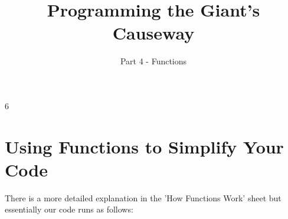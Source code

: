 \documentclass{geocraft-worksheet-multipage}
\begin{document}
\title{Programming the Giant's Causeway}
\subtitle{Part 4 - Functions}

\date{}
\maketitle


\setcounter {section} {6}

\section{Using Functions to Simplify Your Code}\vspace{-0.3cm}
\lstset{language=Python}

\noindent%
%
\vspace{0.1cm}
%
%

There is a more detailed explanation in the 'How Functions Work' sheet
but essentially our code runs as follows: 
\end{document}
